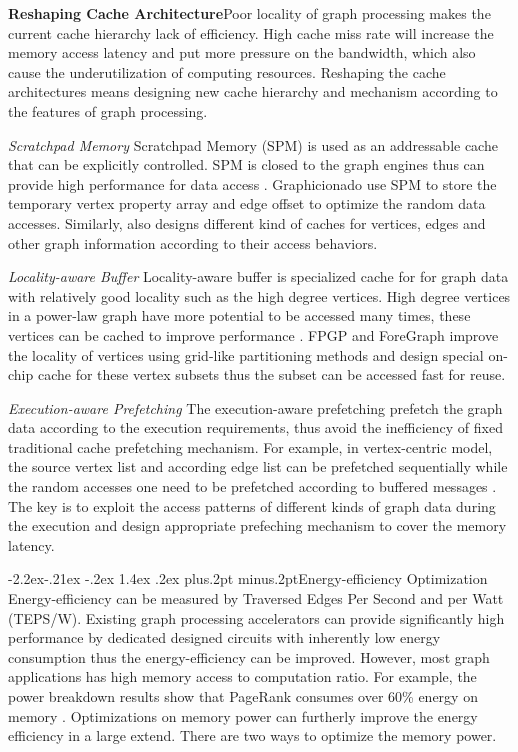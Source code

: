 \documentclass[twoside]{article}
\makeatletter
\def\subsubsection{\@startsection{subsubsection}{3}{\z@}%
 {-2.2ex\@plus -.21ex \@minus -.2ex}%
 {1.4ex \@plus.2ex}
{\normalfont\normalsize\protect\baselineskip=12pt plus.2pt minus.2pt\sl}}
\makeatother
\begin{document}
\begin{multicols}{2}
{\bf Reshaping Cache Architecture}\quad Poor locality of graph processing makes the current cache hierarchy lack of efficiency. High cache miss rate will increase the memory access latency and put more pressure on the bandwidth, which also cause the underutilization of computing resources. Reshaping the cache architectures means designing new cache hierarchy and mechanism according to the features of graph processing.

\textit{Scratchpad Memory} Scratchpad Memory (SPM) is used as an addressable cache that can be explicitly controlled. SPM is closed to the graph engines thus can provide high performance for data access \cite{Windh2015fpgacam,dai2018graphh}. Graphicionado \cite{ham2016graphicionado} use SPM to store the temporary vertex property array and edge offset to optimize the random data accesses. Similarly, \cite{ozdal2016energy} also designs different kind of caches for vertices, edges and other graph information according to their access behaviors. 

\textit{Locality-aware Buffer} Locality-aware buffer is specialized cache for for graph data with relatively good locality such as the high degree vertices. High degree vertices in a power-law graph have more potential to be accessed many times, these vertices can be cached to improve performance \cite{zhou2017tunao}. FPGP \cite{Dai2016fpgp} and ForeGraph \cite{Dai2017foregraph} improve the locality of vertices using grid-like partitioning methods and design special on-chip cache for these vertex subsets thus the subset can be accessed fast for reuse.

\textit{Execution-aware Prefetching} The execution-aware prefetching prefetch the graph data according to the execution requirements, thus avoid the inefficiency of fixed traditional cache prefetching mechanism.  For example, in vertex-centric model, the source vertex list and according edge list can be prefetched sequentially while the random accesses one need to be prefetched according to buffered messages \cite{ahn2015tesseract}. The key is to exploit the access patterns of different kinds of graph data during the execution and design appropriate prefeching mechanism to cover the memory latency.




\subsubsection{Energy-efficiency Optimization}
Energy-efficiency can be measured by Traversed Edges Per Second and per Watt (TEPS/W). Existing graph processing accelerators can provide significantly high performance by dedicated designed circuits with  inherently low energy consumption thus the energy-efficiency can be improved. However, most graph applications has high memory access to computation ratio. For example, the power breakdown results show that PageRank consumes over 60\% energy on memory \cite{guo2015pimenergy}. Optimizations on memory power can furtherly improve the energy efficiency in a large extend. There are two ways to optimize the memory power.


\end{multicols}
\end{document}
